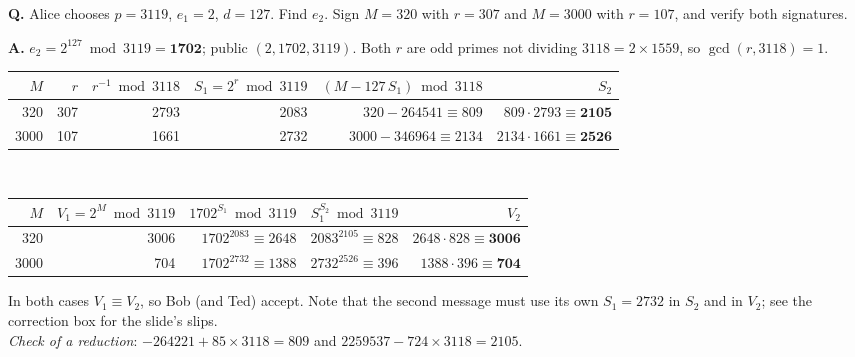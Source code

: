 \begin{worked}
\textbf{Q.} Alice chooses $p = 3119$, $e_1 = 2$, $d = 127$. Find $e_2$. Sign $M = 320$ with $r = 307$ and $M = 3000$ with $r = 107$, and verify both signatures.

\textbf{A.} $e_2 = 2^{127} \bmod 3119 = \mathbf{1702}$; public $(2, 1702, 3119)$. Both $r$ are odd primes not dividing $3118 = 2 \times 1559$, so $\gcd(r, 3118) = 1$.
\begin{center}\small
\begin{tabular}{@{}rrrrrr@{}}
\toprule
$M$ & $r$ & $r^{-1} \bmod 3118$ & $S_1 = 2^r \bmod 3119$ & $(M - 127\,S_1) \bmod 3118$ & $S_2$\\
\midrule
320 & 307 & 2793 & 2083 & $320 - 264541 \equiv 809$ & $809 \cdot 2793 \equiv \mathbf{2105}$\\
3000 & 107 & 1661 & 2732 & $3000 - 346964 \equiv 2134$ & $2134 \cdot 1661 \equiv \mathbf{2526}$\\
\bottomrule
\end{tabular}
\\[4pt]
\begin{tabular}{@{}rrrrr@{}}
\toprule
$M$ & $V_1 = 2^M \bmod 3119$ & $1702^{S_1} \bmod 3119$ & $S_1^{S_2} \bmod 3119$ & $V_2$\\
\midrule
320 & 3006 & $1702^{2083} \equiv 2648$ & $2083^{2105} \equiv 828$ & $2648 \cdot 828 \equiv \mathbf{3006}$\\
3000 & 704 & $1702^{2732} \equiv 1388$ & $2732^{2526} \equiv 396$ & $1388 \cdot 396 \equiv \mathbf{704}$\\
\bottomrule
\end{tabular}
\end{center}
In both cases $V_1 \equiv V_2$, so Bob (and Ted) accept. Note that the second message must use its own $S_1 = 2732$ in $S_2$ and in $V_2$; see the correction box for the slide's slips.\\
\emph{Check of a reduction}: $-264221 + 85 \times 3118 = 809$ and $2259537 - 724 \times 3118 = 2105$.
\end{worked}

